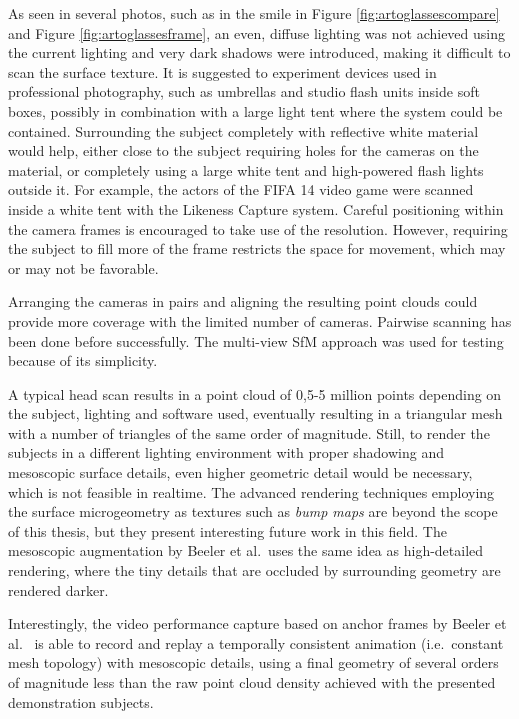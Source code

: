As seen in several photos, such as in the smile in Figure \ref{fig:artoglassescompare} and Figure \ref{fig:artoglassesframe}, an even, diffuse lighting was not achieved using the current lighting and very dark shadows were introduced, making it difficult to scan the surface texture.
It is suggested to experiment devices used in professional photography, such as umbrellas and studio flash units inside soft boxes, possibly in combination with a large light tent where the system could be contained.
Surrounding the subject completely with reflective white material would help, either close to the subject requiring holes for the cameras on the material, or completely using a large white tent and high-powered flash lights outside it.
For example, the actors of the FIFA 14 video game were scanned inside a white tent with the Likeness Capture system. \cite{eafifa14,capturelab}
Careful positioning within the camera frames is encouraged to take use of the resolution.
However, requiring the subject to fill more of the frame restricts the space for movement, which may or may not be favorable.

Arranging the cameras in pairs and aligning the resulting point clouds could provide more coverage with the limited number of cameras.
Pairwise scanning has been done before successfully. \cite{eafifa14,beeler2010high,bradley2010high}
The multi-view SfM approach was used for testing because of its simplicity.

A typical head scan results in a point cloud of 0,5-5 million points depending on the subject, lighting and software used, eventually resulting in a triangular mesh with a number of triangles of the same order of magnitude.
Still, to render the subjects in a different lighting environment with proper shadowing and mesoscopic surface details, even higher geometric detail would be necessary, which is not feasible in realtime.
The advanced rendering techniques employing the surface microgeometry as textures such as \emph{bump maps} are beyond the scope of this thesis, but they present interesting future work in this field.
The mesoscopic augmentation by Beeler et al.\ uses the same idea as high-detailed rendering, where the tiny details that are occluded by surrounding geometry are rendered darker. \cite{beeler2010high}

Interestingly, the video performance capture based on anchor frames by Beeler et al.\ \cite{beeler2011high} is able to record and replay a temporally consistent animation (i.e.\ constant mesh topology) with mesoscopic details, using a final geometry of several orders of magnitude less than the raw point cloud density achieved with the presented demonstration subjects.

